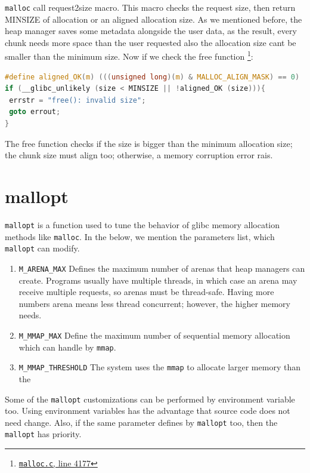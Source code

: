 \documentclass{masterthesis}
\newcommand*\libc{glibc}
\newcommand*\mallocc{\lstinline{malloc}\xspace}
\newcommand*\mmapc{\lstinline{mmap}\xspace}
\begin{document}
\mallocc{} call request2size macro. This macro checks the request size, then return MINSIZE of allocation or an aligned allocation size. As we mentioned before, the heap manager saves some metadata alongside the user data, as the result, every chunk needs more space than the user requested also the allocation size cant be smaller than the minimum size. Now if we check the free function \footnote{\href{https://sourceware.org/git/?p=glibc.git;a=blob;f=malloc/malloc.c;h=f7cd29bc2f93e1082ee77800bd64a4b2a2897055;hb=9ea3686266dca3f004ba874745a4087a89682617\#l4177}{\texttt{malloc.c}, line 4177}}:

\begin{lstlisting}[language=c,frame=tlrb]
#define aligned_OK(m) (((unsigned long)(m) & MALLOC_ALIGN_MASK) == 0)
if (__glibc_unlikely (size < MINSIZE || !aligned_OK (size))){
 errstr = "free(): invalid size";
 goto errout;
}
\end{lstlisting}

The free function checks if the size is bigger than the minimum allocation size; the chunk size must align too; otherwise, a memory corruption error rais.
\section{mallopt}
\label{sect:mallopt}
\lstinline{mallopt} is a function used to tune the behavior of \libc{} memory allocation methods like \mallocc{}. In the below, we mention the parameters list, which \lstinline{mallopt} can modify.

\begin{enumerate}
\item \lstinline{M_ARENA_MAX} Defines the maximum number of arenas that heap managers can create. Programs usually have multiple threads, in which case an arena may receive multiple requests, so arenas must be thread-safe. Having more numbers arena means less thread concurrent; however, the higher memory needs.

\item \lstinline{M_MMAP_MAX} Define the maximum number of sequential memory allocation which can handle by \mmapc{}.

\item \lstinline{M_MMAP_THRESHOLD} The system uses the \mmapc{} to allocate larger memory than the
\end{enumerate}

Some of the \lstinline{mallopt} customizations can be performed by environment variable too. Using environment variables has the advantage that source code does not need change. Also, if the same parameter defines by \lstinline{mallopt} too, then the \lstinline{mallopt} has priority. 
\end{document}
